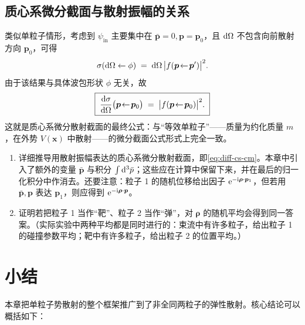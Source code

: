 \subsection{质心系微分截面与散射振幅的关系}

类似单粒子情形，考虑到 $\psi_{\text{in}}$ 主要集中在 $\bar{\bm{p}}=0,\bm{p}=\bm{p}_0$，且 $\mathrm{d}\Omega$ 不包含向前散射方向 $\bm{p}_0$，可得
\begin{equation}
  \sigma(\mathrm{d}\Omega\leftarrow\phi) \;=\; \mathrm{d}\Omega\,\big|f(\bm{p}\!\leftarrow\!\bm{p}')\big|^2.
\end{equation}
由于该结果与具体波包形状 $\phi$ 无关，故
\begin{equation}
  \boxed{\;
  \frac{\mathrm{d}\sigma}{\mathrm{d}\Omega}\big(\bm{p}\!\leftarrow\!\bm{p}_0\big)
  \;=\; \big|f(\bm{p}\!\leftarrow\!\bm{p}_0)\big|^2.
  \;}
  \label{eq:diff-cs-cm}
\end{equation}
这就是质心系微分散射截面的最终公式：与“等效单粒子”——质量为约化质量 $m$，在外势 $V(\bm{x})$ 中散射——的微分截面公式形式上完全一致。

\begin{remark}[作业 3-4 / Taylor 4.2 题]
  \begin{enumerate}
    \item[(a)] 详细推导用散射振幅表达的质心系微分散射截面，即\eqref{eq:diff-cs-cm}。本章中引入了额外的变量 $\bar{\bm{p}}$ 与积分 $\int \mathrm{d}^3\bar{p}$；这些应在计算中保留下来，并在最后的归一化积分中作消去。还要注意：粒子 1 的随机位移给出因子 $\mathrm{e}^{-\mathrm{i}\bm{\rho}\cdot\bm{p}_1}$，但若用 $\bar{\bm{p}},\bm{p}$ 表达 $\bm{p}_1$，则应得到 $\mathrm{e}^{-\mathrm{i}\bm{\rho}\cdot\bm{p}}$。
    \item[(b)] 证明若把粒子 1 当作“靶”、粒子 2 当作“弹”，对 $\bm{\rho}$ 的随机平均会得到同一答案。（实际实验中两种平均都是同时进行的：束流中有许多粒子，给出粒子 1 的碰撞参数平均；靶中有许多粒子，给出粒子 2 的位置平均。）
  \end{enumerate}
\end{remark}

\section{小结}

本章把单粒子势散射的整个框架推广到了非全同两粒子的弹性散射。核心结论可以概括如下：

